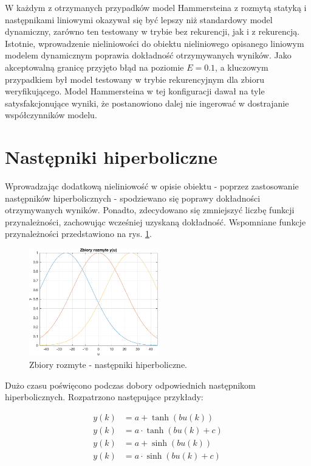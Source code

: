 W każdym z otrzymanych przypadków model Hammersteina z rozmytą statyką i następnikami liniowymi okazywał się być lepszy niż standardowy model dynamiczny, zarówno ten testowany w trybie bez rekurencji, jak i z rekurencją. Istotnie, wprowadzenie nieliniowości do obiektu nieliniowego opisanego liniowym modelem dynamicznym poprawia dokładność otrzymywanych wyników. Jako akceptowalną granicę przyjęto błąd na poziomie $E = \num{0.1}$, a kluczowym przypadkiem był model testowany w trybie rekurencyjnym dla zbioru weryfikującego. Model Hammersteina w tej konfiguracji dawał na tyle satysfakcjonujące wyniki, że postanowiono dalej nie ingerować w dostrajanie współczynników modelu. 

\newpage

\section{Następniki hiperboliczne}
Wprowadzając dodatkową nieliniowość w opisie obiektu - poprzez zastosowanie następników hiperbolicznych - spodziewano się poprawy dokładności otrzymywanych wyników. Ponadto, zdecydowano się zmniejszyć liczbę funkcji przynależności, zachowując wcześniej uzyskaną dokładność. Wspomniane funkcje przynależności przedstawiono na rys. \ref{sets_ham_nlin}.

\begin{figure}[h!]
\centering
\includegraphics[width=0.5\textwidth]{pictures/fuzzy_set_ham_nlin}
\caption{Zbiory rozmyte - następniki hiperboliczne.}
\label{sets_ham_nlin}
\end{figure}

Dużo czasu poświęcono podczas dobory odpowiednich następnikom hiperbolicznych. Rozpatrzono następujące przykłady:

\begin{equation}
\begin{aligned}
y(k) &= a + \tanh(b u(k)) \\
y(k) &= a \cdot \tanh(b u(k) + c) \\
y(k) &= a + \sinh(b u(k)) \\
y(k) &= a \cdot \sinh(b u(k) + c) \\
\end{aligned} 
\end{equation}

